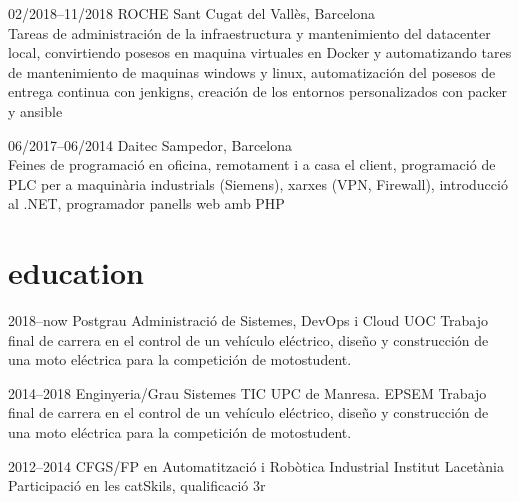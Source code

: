 \documentclass[]{cv-style}          %
\begin{document}
\begin{entrylist}
\entry
  {02/2018--11/2018}
  {ROCHE}
  {Sant Cugat del Vallès, Barcelona}
  {\\
  Tareas de administración de la infraestructura y mantenimiento del datacenter local, convirtiendo posesos en maquina virtuales en Docker y automatizando tares de mantenimiento de maquinas windows y linux, automatización del posesos de entrega continua con jenkigns, creación de los entornos personalizados con packer y ansible
  }
  
\entry
  {06/2017--06/2014}
  {Daitec}
  {Sampedor, Barcelona}
  {\\
  Feines de programació en oficina, remotament i a casa el client, programació de PLC per a maquinària industrials (Siemens), xarxes (VPN, Firewall), introducció al .NET, programador panells web amb PHP}


\end{entrylist}


\section{education}

\begin{entrylist}
\entry
{2018--now}
{Postgrau {\normalfont Administració de Sistemes, DevOps i Cloud}}
{UOC}
{Trabajo final de carrera en el control de un vehículo eléctrico, diseño y construcción de una moto eléctrica para la competición de motostudent.}


\entry
{2014--2018}
{Enginyeria/Grau {\normalfont Sistemes TIC}}
{UPC de Manresa. EPSEM}
{Trabajo final de carrera en el control de un vehículo eléctrico, diseño y construcción de una moto eléctrica para la competición de motostudent.}

\entry
{2012--2014}
{CFGS/FP {\normalfont en Automatització i Robòtica Industrial}}
{Institut Lacetània}
{Participació en les catSkils, qualificació 3r}

\end{entrylist}
\end{document}

